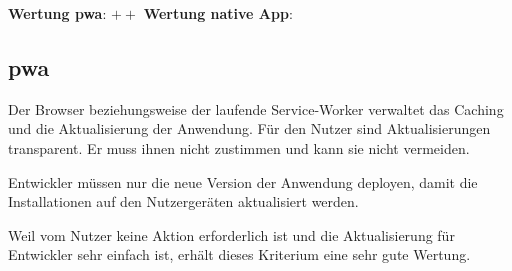 \textbf{Wertung \ac{pwa}}: $++$
\textbf{Wertung native App}:  \\

\subsection{\ac{pwa}}
Der Browser beziehungsweise der laufende Service-Worker verwaltet das Caching und die Aktualisierung der Anwendung. Für den Nutzer sind Aktualisierungen transparent. Er muss ihnen nicht zustimmen und kann sie nicht vermeiden. 

Entwickler müssen nur die neue Version der Anwendung deployen, damit die Installationen auf den Nutzergeräten aktualisiert werden.

Weil vom Nutzer keine Aktion erforderlich ist und die Aktualisierung für Entwickler sehr einfach ist, erhält dieses Kriterium eine sehr gute Wertung.